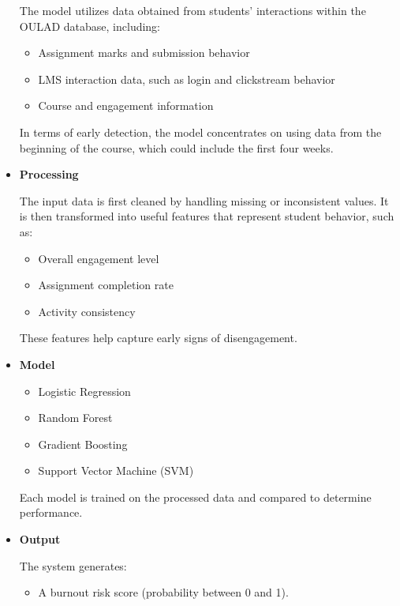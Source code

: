 \begin{spacing}{1.5}
\begin{itemize}
The model utilizes data obtained from students’ interactions within the OULAD database, including:

\begin{itemize}
    
\item Assignment marks and submission behavior
\item LMS interaction data, such as login and clickstream behavior
\item Course and engagement information







\end{itemize}
In terms of early detection, the model concentrates on using data from the beginning of the course, which could include the first four weeks.
\item \textbf{Processing}

The input data is first cleaned by handling missing or inconsistent values. It is then transformed into useful features that represent student behavior, such as:

\begin{itemize}
    \item Overall engagement level

\item Assignment completion rate

\item Activity consistency
\end{itemize}
These features help capture early signs of disengagement.

\item \textbf{Model}
\begin{itemize}
    \item Logistic Regression

\item Random Forest

\item Gradient Boosting

\item Support Vector Machine (SVM)
\end{itemize}
Each model is trained on the processed data and compared to determine performance.


\item \textbf{Output}


The system generates:
\begin{itemize}
    \item A burnout risk score (probability between 0 and 1).


\end{itemize}
\end{itemize}
\end{spacing}
